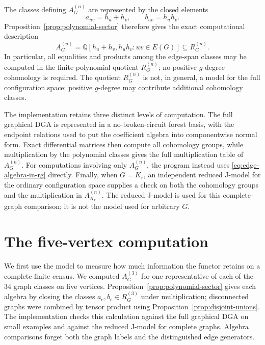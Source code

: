 \documentclass[11pt]{amsart}
\theoremstyle{plain}
\theoremstyle{definition}
\theoremstyle{remark}
\newcommand{\Q}{\mathbb{Q}}
\begin{document}
The classes defining $A_G^{(n)}$ are represented by the closed elements
\[
  a_{uv}=h_u+h_v,
  \qquad
  b_{uv}=h_uh_v.
\]
Proposition~\ref{prop:polynomial-sector} therefore gives the exact
computational description
\begin{equation}\label{eq:edge-algebra-in-rg}
  A_G^{(n)}
  =\Q[h_u+h_v,h_uh_v:uv\in E(G)]
  \subseteq R_G^{(n)}.
\end{equation}
In particular, all equalities and products among the edge-span classes may be
computed in the finite polynomial quotient $R_G^{(n)}$; no positive
$g$-degree cohomology is required.  The quotient $R_G^{(n)}$ is not, in
general, a model for the full configuration space: positive $g$-degree may
contribute additional cohomology classes.

The implementation retains three distinct levels of computation.  The full
graphical DGA is represented in a no-broken-circuit forest basis, with the
endpoint relations used to put the coefficient algebra into componentwise
normal form.  Exact differential matrices then compute all cohomology groups,
while multiplication by the polynomial classes gives the full multiplication
table of $A_G^{(n)}$.  For computations involving only $A_G^{(n)}$, the
program instead uses \eqref{eq:edge-algebra-in-rg} directly.  Finally, when
$G=K_r$, an independent reduced J-model for the ordinary configuration space
\cite{BerceanuMarklPapadima} supplies a check on both the cohomology groups and
the multiplication in $A_{K_r}^{(n)}$.  The reduced J-model is used for this
complete-graph comparison; it is not the model used for arbitrary $G$.

\section{The five-vertex computation}\label{sec:five-vertex-computation}

We first use the model to measure how much information the functor retains on
a complete finite census.  We computed $A_G^{(3)}$ for one representative of
each of the $34$ graph classes on five vertices.
Proposition~\ref{prop:polynomial-sector} gives each
algebra by closing the classes $a_e,b_e\in R_G^{(3)}$ under multiplication;
disconnected graphs were combined by tensor product using
Proposition~\ref{prop:disjoint-unions}.  The implementation
checks this calculation against the full graphical DGA on small examples and
against the reduced J-model for complete graphs.  Algebra comparisons forget
both the graph labels and the distinguished edge generators.
\end{document}
